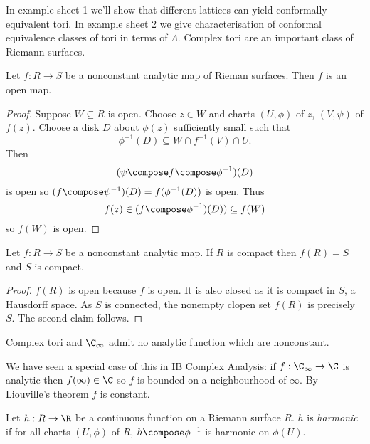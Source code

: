 \documentclass[a4paper]{article}
\begin{document}
In example sheet 1 we'll show that different lattices can yield conformally equivalent tori. In example sheet 2 we give characterisation of conformal equivalence classes of tori in terms of \(\Lambda\). Complex tori are an important class of Riemann surfaces.

\begin{theorem}
  Let \(f: R \to S\) be a nonconstant analytic map of Rieman surfaces. Then \(f\) is an open map.
\end{theorem}

\begin{proof}
  Suppose \(W \subseteq R\) is open. Choose \(z \in W\) and charts \((U, \phi)\) of \(z\), \((V, \psi)\) of \(f(z)\). Choose a disk \(D\) about \(\phi(z)\) sufficiently small such that
  \[
    \phi^{-1}(D) \subseteq W \cap f^{-1}(V) \cap U.
  \]
  Then
  \[
    (\psi \compose f \compose \phi^{-1})(D)
  \]
  is open so \((f \compose \psi^{-1})(D) = f(\phi^{-1}(D))\) is open. Thus
  \[
    f(z) \in (f \compose \phi^{-1})(D)) \subseteq f(W)
  \]
  so \(f(W)\) is open.
\end{proof}

\begin{corollary}
  Let \(f: R \to S\) be a nonconstant analytic map. If \(R\) is compact then \(f(R) = S\) and \(S\) is compact.
\end{corollary}

\begin{proof}
  \(f(R)\) is open because \(f\) is open. It is also closed as it is compact in \(S\), a Hausdorff space. As \(S\) is connected, the nonempty clopen set \(f(R)\) is precisely \(S\). The second claim follows.
\end{proof}

\begin{corollary}
  Complex tori and \(\C_\infty\) admit no analytic function which are nonconstant.
\end{corollary}

We have seen a special case of this in IB Complex Analysis: if \(f: \C_\infty \to \C\) is analytic then \(f(\infty) \in \C\) so \(f\) is bounded on a neighbourhood of \(\infty\). By Liouville's theorem \(f\) is constant.

\begin{definition}
  Let \(h: R \to \R\) be a continuous function on a Riemann surface \(R\). \(h\) is \emph{harmonic} if for all charts \((U, \phi)\) of \(R\), \(h \compose \phi^{-1}\) is harmonic on \(\phi(U)\).
\end{definition}
\end{document}
